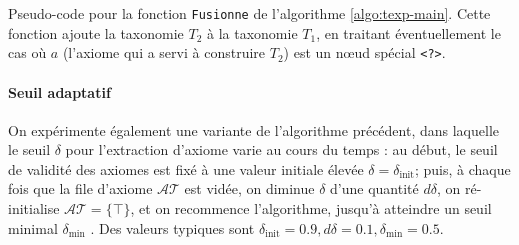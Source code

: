 \begin{algorithm}
\caption{Pseudo-code pour la fonction \texttt{Fusionne} de l'algorithme \ref{algo:texp-main}. Cette fonction ajoute la taxonomie $T_2$ à la taxonomie $T_1$, en traitant éventuellement le cas où $a$ (l'axiome qui a servi à construire $T_2$) est un nœud spécial \texttt{<?>}.}
\label{algo:texp-fusionne}
\end{algorithm}






\paragraph{Seuil adaptatif} On expérimente également une variante de l'algorithme précédent, dans laquelle le seuil $\delta$ pour l'extraction d'axiome varie au cours du temps : au début, le seuil de validité des axiomes est fixé à une valeur initiale élevée $\delta = \delta_\text{init}$; puis, à chaque fois que la file d'axiome $\mathcal{AT}$ est vidée, on diminue $\delta$ d'une quantité $d\delta$, on ré-initialise $\mathcal{AT} = \{ \top \}$, et on recommence l'algorithme, jusqu'à atteindre un seuil minimal $\delta_\text{min}$ . Des valeurs typiques sont $\delta_\text{init} = 0.9, d\delta = 0.1, \delta_\text{min} = 0.5$.

